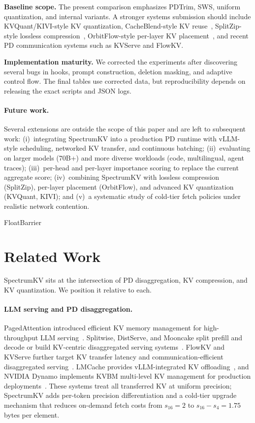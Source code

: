 \documentclass[11pt]{article}
\newcommand{\method}{SpectrumKV}
\theoremstyle{plain}
\theoremstyle{definition}
\begin{document}
\textbf{Baseline scope.}  The present comparison emphasizes PDTrim, SWS, uniform quantization, and internal variants.  A stronger systems submission should include KVQuant/KIVI-style KV quantization, CacheBlend-style KV reuse~\citep{cacheblend}, SplitZip-style lossless compression~\citep{splitzip}, OrbitFlow-style per-layer KV placement~\citep{orbitflow}, and recent PD communication systems such as KVServe and FlowKV.

\textbf{Implementation maturity.}  We corrected the experiments after discovering several bugs in hooks, prompt construction, deletion masking, and adaptive control flow.  The final tables use corrected data, but reproducibility depends on releasing the exact scripts and JSON logs.

\paragraph{Future work.}
Several extensions are outside the scope of this paper and are left to subsequent work: (i)~integrating \method{} into a production PD runtime with vLLM-style scheduling, networked KV transfer, and continuous batching; (ii)~evaluating on larger models (70B+) and more diverse workloads (code, multilingual, agent traces); (iii)~per-head and per-layer importance scoring to replace the current aggregate score; (iv)~combining \method{} with lossless compression (SplitZip), per-layer placement (OrbitFlow), and advanced KV quantization (KVQuant, KIVI); and (v)~a systematic study of cold-tier fetch policies under realistic network contention.

FloatBarrier
\section{Related Work}
\label{sec:related}

\method{} sits at the intersection of PD disaggregation, KV compression, and KV quantization.  We position it relative to each.

\paragraph{LLM serving and PD disaggregation.}
PagedAttention introduced efficient KV memory management for high-throughput LLM serving~\citep{pagedattention}.  Splitwise, DistServe, and Mooncake split prefill and decode or build KV-centric disaggregated serving systems~\citep{splitwise,distserve,mooncake}.  FlowKV and KVServe further target KV transfer latency and communication-efficient disaggregated serving~\citep{flowkv,kvserve}.  LMCache provides vLLM-integrated KV offloading~\citep{lmcache}, and NVIDIA Dynamo implements KVBM multi-level KV management for production deployments~\citep{nvidiadynamo}.  These systems treat all transferred KV at uniform precision; \method{} adds per-token precision differentiation and a cold-tier upgrade mechanism that reduces on-demand fetch costs from $s_{16}=2$ to $s_{16}-s_4=1.75$ bytes per element.
\end{document}
